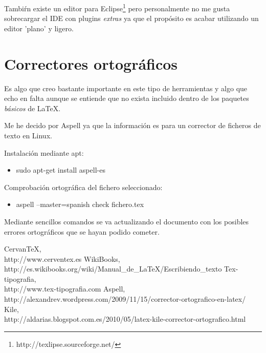 \documentclass[11pt]{article}
\begin{document}
Tambi\'rn existe un editor para Eclipse\footnote{http://texlipse.sourceforge.net/} pero personalmente no me gusta sobrecargar el IDE con plugins \emph{extras} ya que el prop\'osito es acabar utilizando un editor 'plano' y ligero.

\section{Correctores ortogr\'aficos}

Es algo que creo bastante importante en este tipo de herramientas y algo que echo en falta aunque se entiende que no exista incluido dentro de los paquetes \emph{b\'asicos} de \LaTeX{}.

Me he decido por Aspell ya que la informaci\'on es para un corrector de ficheros de texto en Linux.

Instalaci\'on mediante apt: 
\begin{itemize}
	\item sudo apt-get install aspell-es
\end{itemize}
Comprobaci\'on ortogr\'afica del fichero seleccionado:
\begin{itemize}
	\item aspell –master=spanish  check fichero.tex
\end{itemize}

Mediante sencillos comandos se va actualizando el documento con los posibles errores ortogr\'aficos que se hayan podido cometer.

\begin{thebibliography}{9}

    CervanTeX,\\
    http://www.cerventex.es
    WikiBooks,\\
    http://es.wikibooks.org/wiki/Manual\_de\_LaTeX/Escribiendo\_texto
    Tex-tipografia,\\
    http://www.tex-tipografia.com 
    Aspell,\\
    http://alexandrev.wordpress.com/2009/11/15/corrector-ortografico-en-latex/
    Kile,\\
    http://aldarias.blogspot.com.es/2010/05/latex-kile-corrector-ortografico.html

\end{thebibliography}
\end{document}
